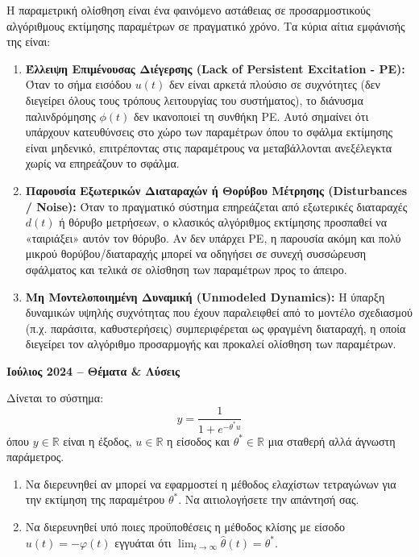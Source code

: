 \documentclass[a4paper,11pt]{article}
\newcommand{\examyear}[1]{\def\currentexamyear{#1}\markboth{#1}{#1}}
\def\currentexamyear{}
\begin{document}
\begin{answer}
Η παραμετρική ολίσθηση είναι ένα φαινόμενο αστάθειας σε προσαρμοστικούς αλγόριθμους εκτίμησης παραμέτρων σε πραγματικό χρόνο. Τα κύρια αίτια εμφάνισής της είναι:
\begin{enumerate}
    \item \textbf{Έλλειψη Επιμένουσας Διέγερσης (Lack of Persistent Excitation - PE):} Όταν το σήμα εισόδου $u(t)$ δεν είναι αρκετά πλούσιο σε συχνότητες (δεν διεγείρει όλους τους τρόπους λειτουργίας του συστήματος), το διάνυσμα παλινδρόμησης $\phi(t)$ δεν ικανοποιεί τη συνθήκη PE. Αυτό σημαίνει ότι υπάρχουν κατευθύνσεις στο χώρο των παραμέτρων όπου το σφάλμα εκτίμησης είναι μηδενικό, επιτρέποντας στις παραμέτρους να μεταβάλλονται ανεξέλεγκτα χωρίς να επηρεάζουν το σφάλμα.
    \item \textbf{Παρουσία Εξωτερικών Διαταραχών ή Θορύβου Μέτρησης (Disturbances / Noise):} Όταν το πραγματικό σύστημα επηρεάζεται από εξωτερικές διαταραχές $d(t)$ ή θόρυβο μετρήσεων, ο κλασικός αλγόριθμος εκτίμησης προσπαθεί να «ταιριάξει» αυτόν τον θόρυβο. Αν δεν υπάρχει PE, η παρουσία ακόμη και πολύ μικρού θορύβου/διαταραχής μπορεί να οδηγήσει σε συνεχή συσσώρευση σφάλματος και τελικά σε ολίσθηση των παραμέτρων προς το άπειρο.
    \item \textbf{Μη Μοντελοποιημένη Δυναμική (Unmodeled Dynamics):} Η ύπαρξη δυναμικών υψηλής συχνότητας που έχουν παραλειφθεί από το μοντέλο σχεδιασμού (π.χ. παράσιτα, καθυστερήσεις) συμπεριφέρεται ως φραγμένη διαταραχή, η οποία διεγείρει τον αλγόριθμο προσαρμογής και προκαλεί ολίσθηση των παραμέτρων.
\end{enumerate}
\end{answer}

\newpage

\hypertarget{exam4}{}
\examyear{Ιούλιος 2024}

\begin{center}
\textbf{\Large Ιούλιος 2024 -- Θέματα \& Λύσεις}
\end{center}

\begin{question}
Δίνεται το σύστημα:
\begin{equation}
    y = \frac{1}{1 + e^{-\theta^* u}}
\end{equation}
όπου $y \in \mathbb{R}$ είναι η έξοδος, $u \in \mathbb{R}$ η είσοδος και $\theta^* \in \mathbb{R}$ μια σταθερή αλλά άγνωστη παράμετρος.
\begin{enumerate}[label=\alph*)]
    \item Να διερευνηθεί αν μπορεί να εφαρμοστεί η μέθοδος ελαχίστων τετραγώνων για την εκτίμηση της παραμέτρου $\theta^*$. Να αιτιολογήσετε την απάντησή σας.
    \item Να διερευνηθεί υπό ποιες προϋποθέσεις η μέθοδος κλίσης με είσοδο $u(t) = -\varphi(t)$ εγγυάται ότι $\lim_{t \to \infty} \hat{\theta}(t) = \theta^*$.
\end{enumerate}
\end{question}
\end{document}
